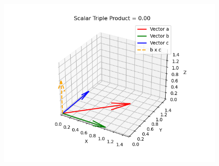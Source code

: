 \documentclass[journal]{IEEEtran}
\begin{document}
\begin{figure}
    \centering
    \includegraphics[width=0.9\columnwidth]{figs/fig42.png}
    \caption{}
    \label{fig:placeholder}
\end{figure}
\end{document}
